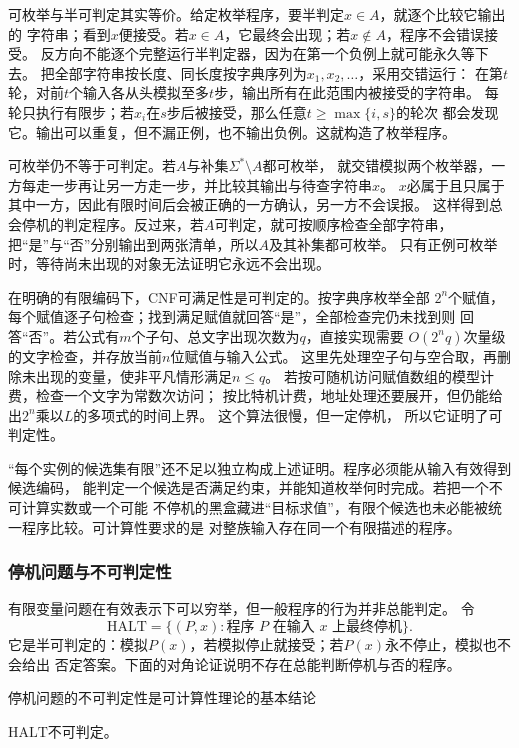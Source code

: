 可枚举与半可判定其实等价。给定枚举程序，要半判定$x\in A$，就逐个比较它输出的
字符串；看到$x$便接受。若$x\in A$，它最终会出现；若$x\notin A$，程序不会错误接受。
反方向不能逐个完整运行半判定器，因为在第一个负例上就可能永久等下去。
把全部字符串按长度、同长度按字典序列为$x_1,x_2,\ldots$，采用交错运行：
在第$t$轮，对前$t$个输入各从头模拟至多$t$步，输出所有在此范围内被接受的字符串。
每轮只执行有限步；若$x_i$在$s$步后被接受，那么任意$t\geq\max\{i,s\}$的轮次
都会发现它。输出可以重复，但不漏正例，也不输出负例。这就构造了枚举程序。

可枚举仍不等于可判定。若$A$与补集$\Sigma^\ast\setminus A$都可枚举，
就交错模拟两个枚举器，一方每走一步再让另一方走一步，并比较其输出与待查字符串$x$。
$x$必属于且只属于其中一方，因此有限时间后会被正确的一方确认，另一方不会误报。
这样得到总会停机的判定程序。反过来，若$A$可判定，就可按顺序检查全部字符串，
把“是”与“否”分别输出到两张清单，所以$A$及其补集都可枚举。
只有正例可枚举时，等待尚未出现的对象无法证明它永远不会出现。

在明确的有限编码下，CNF可满足性是可判定的。按字典序枚举全部
$2^n$个赋值，每个赋值逐子句检查；找到满足赋值就回答“是”，全部检查完仍未找到则
回答“否”。若公式有$m$个子句、总文字出现次数为$q$，直接实现需要
$O(2^n q)$次量级的文字检查，并存放当前$n$位赋值与输入公式。
这里先处理空子句与空合取，再删除未出现的变量，使非平凡情形满足$n\leq q$。
若按可随机访问赋值数组的模型计费，检查一个文字为常数次访问；
按比特机计费，地址处理还要展开，但仍能给出$2^n$乘以$L$的多项式的时间上界。
这个算法很慢，但一定停机，
所以它证明了可判定性。

“每个实例的候选集有限”还不足以独立构成上述证明。程序必须能从输入有效得到候选编码，
能判定一个候选是否满足约束，并能知道枚举何时完成。若把一个不可计算实数或一个可能
不停机的黑盒藏进“目标求值”，有限个候选也未必能被统一程序比较。可计算性要求的是
对整族输入存在同一个有限描述的程序。

\subsubsection{停机问题与不可判定性}
\label{sec:comb-halting}

有限变量问题在有效表示下可以穷举，但一般程序的行为并非总能判定。
令
\[
  \mathrm{HALT}
  =
  \{(P,x):\text{程序 }P\text{ 在输入 }x\text{ 上最终停机}\}.
\]
它是半可判定的：模拟$P(x)$，若模拟停止就接受；若$P(x)$永不停止，模拟也不会给出
否定答案。下面的对角论证说明不存在总能判断停机与否的程序。

停机问题的不可判定性是可计算性理论的基本结论
\begin{theorem}[停机问题不可判定]
\label{thm:comb-halting-undecidable}
$\mathrm{HALT}$不可判定。
\end{theorem}

